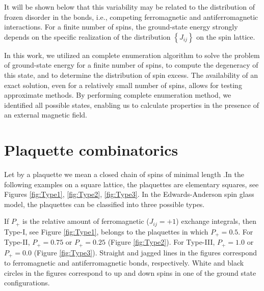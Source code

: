 \documentclass[utf8, babel, sor, jor, amsmath, amssymb, reprint]{elsarticle} %
\begin{document}
It will be shown below that this variability may be related to the distribution of frozen disorder in the bonds, i.e., competing ferromagnetic and antiferromagnetic interactions. For a finite number of spins, the ground-state energy strongly depends on the specific realization of the distribution $\left\lbrace J_{ij} \right\rbrace$ on the spin lattice.  

In this work, we utilized an complete enumeration algorithm \cite{dias2023ground, padalko2021parallel} to solve the problem of ground-state energy for a finite number of spins, to compute the degeneracy of this state, and to determine the distribution of spin excess. The availability of an exact solution, even for a relatively small number of spins, allows for testing approximate methods. By performing complete enumeration method, we identified all possible states, enabling us to calculate properties in the presence of an external magnetic field.

\section{Plaquette combinatorics}

Let by a plaquette we mean a closed chain of spins of minimal length \cite{lebrecht2015j}.In the following examples on a square lattice, the plaquettes are elementary squares, see Figures \ref{fig:Type1}, \ref{fig:Type2}, \ref{fig:Type3}. In the Edwards-Anderson spin glass model, the plaquettes can be classified into three possible types. 

If $P_+$ is the relative amount of ferromagnetic ($J_{ij}=+1$) exchange integrals, then Type-I, see Figure \ref{fig:Type1}, belongs to the plaquettes in which $P_+=0.5$. For Type-II, $P_+=0.75$ or $P_+=0.25$ (Figure \ref{fig:Type2}). For Type-III, $P_+=1.0$ or $P_+=0.0$ (Figure \ref{fig:Type3}). Straight and jagged lines in the figures correspond to ferromagnetic and antiferromagnetic bonds, respectively. White and black circles in the figures correspond to up and down spins in one of the ground state configurations.
\end{document}
